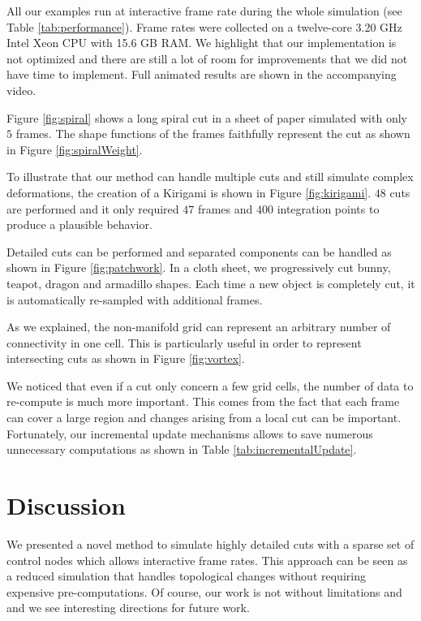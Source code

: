All our examples run at interactive frame rate during the whole simulation (see Table \ref{tab:performance}). Frame rates were collected on a twelve-core 3.20 GHz Intel Xeon CPU with 15.6 GB RAM. We highlight that our implementation is not optimized and there are still a lot of room for improvements that we did not have time to implement. Full animated results are shown in the accompanying video.

Figure \ref{fig:spiral} shows a long spiral cut in a sheet of paper simulated with only $5$ frames. The shape functions of the frames faithfully represent the cut as shown in Figure \ref{fig:spiralWeight}. 

To illustrate that our method can handle multiple cuts and still simulate complex deformations, the creation of a Kirigami is shown in Figure \ref{fig:kirigami}. $48$ cuts are performed and it only required $47$ frames and $400$ integration points to produce a plausible behavior.

Detailed cuts can be performed and separated components can be handled as shown in Figure \ref{fig:patchwork}. In a cloth sheet, we progressively cut bunny, teapot, dragon and armadillo shapes. Each time a new object is completely cut, it is automatically re-sampled with additional frames.

As we explained, the non-manifold grid can represent an arbitrary number of connectivity in one cell. This is particularly useful in order to represent intersecting cuts as shown in Figure \ref{fig:vortex}.

We noticed that even if a cut only concern a few grid cells, the number of data to re-compute is much more important. This comes from the fact that each frame can cover a large region and changes arising from a local cut can be important. Fortunately, our incremental update mechanisms allows to save numerous unnecessary computations as shown in Table \ref{tab:incrementalUpdate}. 

\section{Discussion} \label{sec:discussion}

We presented a novel method to simulate highly detailed cuts with a sparse set of control nodes which allows interactive frame rates. This approach can be seen as a reduced simulation that handles topological changes without requiring expensive pre-computations. Of course, our work is not without limitations and and we see interesting directions for future work.

